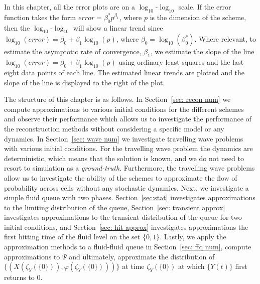 In this chapter, all the error plots are on a \(\log_{10}\)-\(\log_{10}\) scale. If the error function takes the form \(error = \beta_0^* p^{\beta_1}\), where \(p\) is the dimension of the scheme, then the \(\log_{10}\)-\(\log_{10}\) will show a linear trend since \(\log_{10}(error) = \beta_0 + \beta_1 \log_{10}(p)\), where \(\beta_0=\log_{10}(\beta_0^*)\). Where relevant, to estimate the asymptotic rate of convergence, \(\beta_1\), we estimate the slope of the line \(\log_{10}(error) = \beta_0 + \beta_1 \log_{10}(p)\) using ordinary least squares and the last eight data points of each line. The estimated linear trends are plotted and the slope of the line is displayed to the right of the plot. 

The structure of this chapter is as follows. In Section~\ref{sec: recon num} we compute approximations to various initial conditions for the different schemes and observe their performance which allows us to investigate the performance of the reconstruction methods without considering a specific model or any dynamics. In Section~\ref{sec: wave num} we investigate travelling wave problems with various initial conditions. For the travelling wave problem the dynamics are deterministic, which means that the solution is known, and we do not need to resort to simulation as a \emph{ground-truth}. Furthermore, the travelling wave problems allow us to investigate the ability of the schemes to approximate the flow of probability across cells without any stochastic dynamics. Next, we investigate a simple fluid queue with two phases. Section~\ref{sec:stat} investigates approximations to the limiting distribution of the queue, Section~\ref{sec: transient approx} investigates approximations to the transient distribution of the queue for two initial conditions, and Section~\ref{sec: hit approx} investigates approximations the first hitting time of the fluid level on the set \(\{0,1\}\). Lastly, we apply the approximation methods to a fluid-fluid queue in Section~\ref{sec: ffq num}, compute approximations to \(\mathbb \Psi\) and ultimately, approximate the distribution of \(\{(X(\zeta_{Y}(\{0\})),\varphi(\zeta_{Y}(\{0\})))\}\) at time \(\zeta_{Y}(\{0\})\) at which \(\{Y(t)\}\) first returns to \(0\). 



